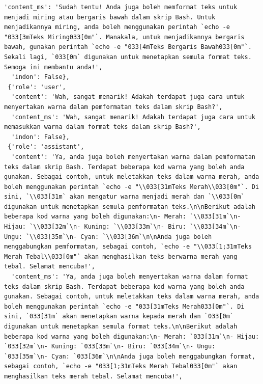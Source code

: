 \documentclass[preprint]{article}
\begin{document}
\begin{lstlisting}[breaklines=true]
  'content_ms': 'Sudah tentu! Anda juga boleh memformat teks untuk menjadi miring atau bergaris bawah dalam skrip Bash. Untuk menjadikannya miring, anda boleh menggunakan perintah `echo -e "033[3mTeks Miring033[0m"`. Manakala, untuk menjadikannya bergaris bawah, gunakan perintah `echo -e "033[4mTeks Bergaris Bawah033[0m"`. Sekali lagi, `033[0m` digunakan untuk menetapkan semula format teks. Semoga ini membantu anda!',
  'indon': False},
 {'role': 'user',
  'content': 'Wah, sangat menarik! Adakah terdapat juga cara untuk menyertakan warna dalam pemformatan teks dalam skrip Bash?',
  'content_ms': 'Wah, sangat menarik! Adakah terdapat juga cara untuk memasukkan warna dalam format teks dalam skrip Bash?',
  'indon': False},
 {'role': 'assistant',
  'content': 'Ya, anda juga boleh menyertakan warna dalam pemformatan teks dalam skrip Bash. Terdapat beberapa kod warna yang boleh anda gunakan. Sebagai contoh, untuk meletakkan teks dalam warna merah, anda boleh menggunakan perintah `echo -e "\\033[31mTeks Merah\\033[0m"`. Di sini, `\\033[31m` akan mengatur warna menjadi merah dan `\\033[0m` digunakan untuk menetapkan semula pemformatan teks.\n\nBerikut adalah beberapa kod warna yang boleh digunakan:\n- Merah: `\\033[31m`\n- Hijau: `\\033[32m`\n- Kuning: `\\033[33m`\n- Biru: `\\033[34m`\n- Ungu: `\\033[35m`\n- Cyan: `\\033[36m`\n\nAnda juga boleh menggabungkan pemformatan, sebagai contoh, `echo -e "\\033[1;31mTeks Merah Tebal\\033[0m"` akan menghasilkan teks berwarna merah yang tebal. Selamat mencuba!',
  'content_ms': 'Ya, anda juga boleh menyertakan warna dalam format teks dalam skrip Bash. Terdapat beberapa kod warna yang boleh anda gunakan. Sebagai contoh, untuk meletakkan teks dalam warna merah, anda boleh menggunakan perintah `echo -e "033[31mTeks Merah033[0m"`. Di sini, `033[31m` akan menetapkan warna kepada merah dan `033[0m` digunakan untuk menetapkan semula format teks.\n\nBerikut adalah beberapa kod warna yang boleh digunakan:\n- Merah: `033[31m`\n- Hijau: `033[32m`\n- Kuning: `033[33m`\n- Biru: `033[34m`\n- Ungu: `033[35m`\n- Cyan: `033[36m`\n\nAnda juga boleh menggabungkan format, sebagai contoh, `echo -e "033[1;31mTeks Merah Tebal033[0m"` akan menghasilkan teks merah tebal. Selamat mencuba!',

\end{lstlisting}
\end{document}
